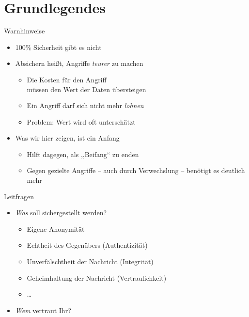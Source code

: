 \section{Grundlegendes}
\begin{frame}{Warnhinweise}
  \begin{itemize}
    \item 100\% Sicherheit gibt es nicht
    \item Absichern heißt, Angriffe \emph{teurer} zu machen
    \begin{itemize}
    \item Die Kosten für den Angriff\\ müssen den Wert der Daten übersteigen
    \item Ein Angriff darf sich nicht mehr \emph{lohnen}
    \item Problem: Wert wird oft unterschätzt
    \end{itemize}
    \item Was wir hier zeigen, ist ein Anfang
    \begin{itemize}
      \item Hilft dagegen, als ,,Beifang`` zu enden
      \item Gegen gezielte Angriffe -- auch durch Verwechslung -- benötigt es deutlich mehr
    \end{itemize}
  \end{itemize}
\end{frame}

\begin{frame}{Leitfragen}
  \begin{itemize}
    \item \emph{Was} soll sichergestellt werden?
      \begin{itemize}
        \item Eigene Anonymität
        \item Echtheit des Gegenübers (Authentizität)
        \item Unverfälschtheit der Nachricht (Integrität)
        \item Geheimhaltung der Nachricht (Vertraulichkeit)
        \item \ldots
      \end{itemize}
    \item \emph{Wem} vertraut Ihr?
  \end{itemize}
\end{frame}

